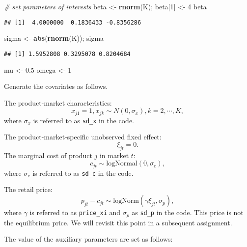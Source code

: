 \documentclass[
]{book}
\newenvironment{Shaded}{\begin{snugshade}}{\end{snugshade}}
\newcommand{\CommentTok}[1]{\textcolor[rgb]{0.56,0.35,0.01}{\textit{#1}}}
\newcommand{\DecValTok}[1]{\textcolor[rgb]{0.00,0.00,0.81}{#1}}
\newcommand{\FloatTok}[1]{\textcolor[rgb]{0.00,0.00,0.81}{#1}}
\newcommand{\FunctionTok}[1]{\textcolor[rgb]{0.13,0.29,0.53}{\textbf{#1}}}
\newcommand{\NormalTok}[1]{#1}
\newcommand{\OtherTok}[1]{\textcolor[rgb]{0.56,0.35,0.01}{#1}}
\begin{document}
\begin{Shaded}
\begin{Highlighting}[]
\CommentTok{\# set parameters of interests}
\NormalTok{beta }\OtherTok{\textless{}{-}} \FunctionTok{rnorm}\NormalTok{(K); }
\NormalTok{beta[}\DecValTok{1}\NormalTok{] }\OtherTok{\textless{}{-}} \DecValTok{4}
\NormalTok{beta}
\end{Highlighting}
\end{Shaded}

\begin{verbatim}
## [1]  4.0000000  0.1836433 -0.8356286
\end{verbatim}

\begin{Shaded}
\begin{Highlighting}[]
\NormalTok{sigma }\OtherTok{\textless{}{-}} \FunctionTok{abs}\NormalTok{(}\FunctionTok{rnorm}\NormalTok{(K)); sigma}
\end{Highlighting}
\end{Shaded}

\begin{verbatim}
## [1] 1.5952808 0.3295078 0.8204684
\end{verbatim}

\begin{Shaded}
\begin{Highlighting}[]
\NormalTok{mu }\OtherTok{\textless{}{-}} \FloatTok{0.5}
\NormalTok{omega }\OtherTok{\textless{}{-}} \DecValTok{1}
\end{Highlighting}
\end{Shaded}

Generate the covariates as follows.

The product-market characteristics:
\[
x_{j1} = 1, x_{jk} \sim N(0, \sigma_x), k = 2, \cdots, K,
\]
where \(\sigma_x\) is referred to as \texttt{sd\_x} in the code.

The product-market-specific unobserved fixed effect:
\[
\xi_{jt} = 0.
\]
The marginal cost of product \(j\) in market \(t\):
\[
c_{jt} \sim \text{logNormal}(0, \sigma_c),
\]
where \(\sigma_c\) is referred to as \texttt{sd\_c} in the code.

The retail price:
\[
p_{jt} - c_{jt} \sim \text{logNorm}(\gamma \xi_{jt}, \sigma_p),
\]
where \(\gamma\) is referred to as \texttt{price\_xi} and \(\sigma_p\) as \texttt{sd\_p} in the code. This price is not the equilibrium price. We will revisit this point in a subsequent assignment.

The value of the auxiliary parameters are set as follows:
\end{document}
